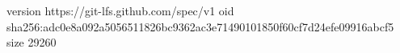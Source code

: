 version https://git-lfs.github.com/spec/v1
oid sha256:adc0e8a092a5056511826bc9362ac3e71490101850f60cf7d24efe09916abcf5
size 29260
